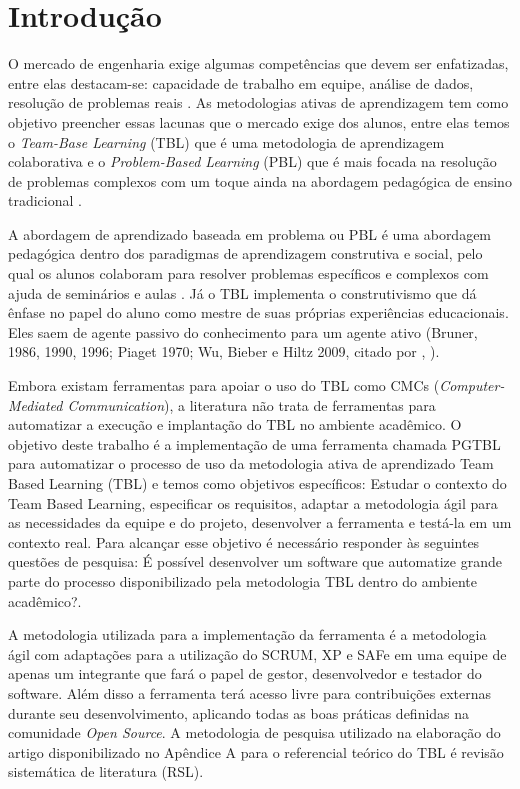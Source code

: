 \chapter*[Introdução]{Introdução}

O mercado de engenharia exige algumas competências que devem ser enfatizadas, entre elas destacam-se: capacidade de
trabalho em equipe, análise de dados, resolução de problemas reais \cite{davis}. As metodologias ativas de aprendizagem
tem como objetivo preencher essas lacunas que o mercado exige dos alunos, entre elas temos o \textit{Team-Base Learning}
(TBL) que é uma metodologia de aprendizagem colaborativa e o \textit{Problem-Based Learning} (PBL) que é mais focada na resolução de problemas complexos com um toque ainda na abordagem pedagógica de ensino tradicional \cite{cabrera}.

A abordagem de aprendizado baseada em problema ou PBL é uma abordagem pedagógica dentro dos paradigmas de aprendizagem
construtiva e social, pelo qual os alunos colaboram para resolver problemas específicos e complexos com ajuda de
seminários e aulas \cite{gomez}. Já o TBL implementa o construtivismo que dá ênfase no papel do aluno como mestre de
suas próprias experiências educacionais. Eles saem de agente passivo do conhecimento para um agente ativo (Bruner, 1986,
1990, 1996; Piaget 1970; Wu, Bieber e Hiltz 2009, citado por \citeauthor{gomez}, \citeyear{gomez}).

Embora existam ferramentas para apoiar o uso do TBL como CMCs (\textit{Computer-Mediated Communication}), a literatura não trata de ferramentas para automatizar a execução e implantação do TBL no ambiente acadêmico. O objetivo deste trabalho é a implementação de uma ferramenta chamada PGTBL para automatizar o processo de uso da metodologia ativa de aprendizado Team Based Learning (TBL) e temos como objetivos específicos: Estudar o contexto do Team Based Learning, especificar os requisitos, adaptar a metodologia ágil para as necessidades da equipe e do projeto, desenvolver a ferramenta e testá-la em um contexto real. Para alcançar esse objetivo é necessário responder às seguintes questões de pesquisa: É possível desenvolver um software que automatize grande parte do processo disponibilizado pela metodologia TBL dentro do ambiente acadêmico?.

A metodologia utilizada para a implementação da ferramenta é a metodologia ágil com adaptações para a utilização do SCRUM, XP e SAFe em uma equipe de apenas um integrante que fará o papel de gestor, desenvolvedor e testador do software.  Além disso a ferramenta terá acesso livre para contribuições externas durante seu desenvolvimento, aplicando todas as boas práticas definidas na comunidade \textit{Open Source}. A metodologia de pesquisa utilizado na elaboração do artigo disponibilizado no Apêndice A para o referencial teórico do TBL é revisão sistemática de literatura (RSL).

